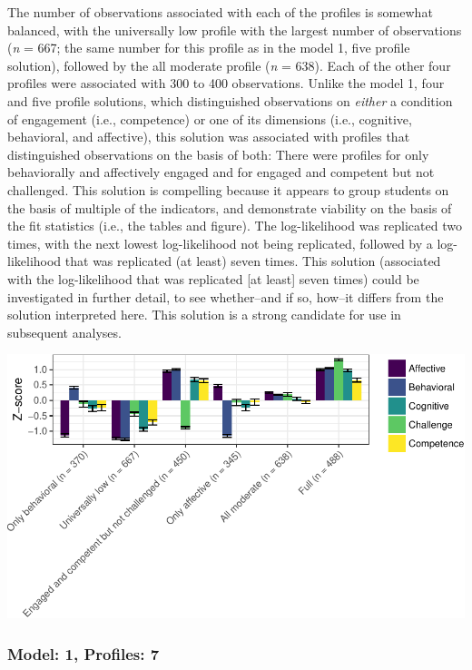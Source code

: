 \documentclass[]{msu-thesis}
\theoremstyle{definition}
\theoremstyle{definition}
\theoremstyle{definition}
\theoremstyle{remark}
\begin{document}
The number of observations associated with each of the profiles is
somewhat balanced, with the universally low profile with the largest
number of observations (\emph{n} = 667; the same number for this profile
as in the model 1, five profile solution), followed by the all moderate
profile (\emph{n} = 638). Each of the other four profiles were
associated with 300 to 400 observations. Unlike the model 1, four and
five profile solutions, which distinguished observations on
\emph{either} a condition of engagement (i.e., competence) or one of its
dimensions (i.e., cognitive, behavioral, and affective), this solution
was associated with profiles that distinguished observations on the
basis of both: There were profiles for only behaviorally and affectively
engaged and for engaged and competent but not challenged. This solution
is compelling because it appears to group students on the basis of
multiple of the indicators, and demonstrate viability on the basis of
the fit statistics (i.e., the tables and figure). The log-likelihood was
replicated two times, with the next lowest log-likelihood not being
replicated, followed by a log-likelihood that was replicated (at least)
seven times. This solution (associated with the log-likelihood that was
replicated {[}at least{]} seven times) could be investigated in further
detail, to see whether--and if so, how--it differs from the solution
interpreted here. This solution is a strong candidate for use in
subsequent analyses.

\begin{center}\includegraphics[width=0.8\linewidth]{rosenberg-dissertation_files/figure-latex/m1_6p-1} \end{center}

\subsubsection{Model: 1, Profiles: 7}\label{model-1-profiles-7}
\end{document}
